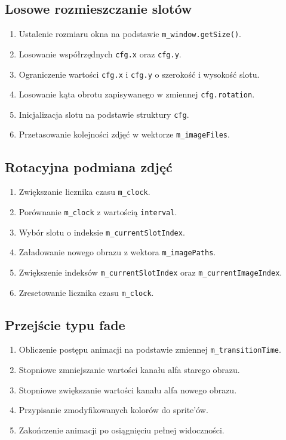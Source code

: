 \documentclass[12pt]{article}
\begin{document}
\subsection{Losowe rozmieszczanie slotów}
\begin{enumerate}
    \item Ustalenie rozmiaru okna na podstawie \texttt{m\_window.getSize()}.
    \item Losowanie współrzędnych \texttt{cfg.x} oraz \texttt{cfg.y}.
    \item Ograniczenie wartości \texttt{cfg.x} i \texttt{cfg.y} o szerokość i wysokość slotu.
    \item Losowanie kąta obrotu zapisywanego w zmiennej \texttt{cfg.rotation}.
    \item Inicjalizacja slotu na podstawie struktury \texttt{cfg}.
    \item Przetasowanie kolejności zdjęć w wektorze \texttt{m\_imageFiles}.
\end{enumerate}

\subsection{Rotacyjna podmiana zdjęć}
\begin{enumerate}
    \item Zwiększanie licznika czasu \texttt{m\_clock}.
    \item Porównanie \texttt{m\_clock} z wartością \texttt{interval}.
    \item Wybór slotu o indeksie \texttt{m\_currentSlotIndex}.
    \item Załadowanie nowego obrazu z wektora \texttt{m\_imagePaths}.
    \item Zwiększenie indeksów \texttt{m\_currentSlotIndex} oraz \texttt{m\_currentImageIndex}.
    \item Zresetowanie licznika czasu \texttt{m\_clock}.
\end{enumerate}

\subsection{Przejście typu fade}
\begin{enumerate}
    \item Obliczenie postępu animacji na podstawie zmiennej \texttt{m\_transitionTime}.
    \item Stopniowe zmniejszanie wartości kanału alfa starego obrazu.
    \item Stopniowe zwiększanie wartości kanału alfa nowego obrazu.
    \item Przypisanie zmodyfikowanych kolorów do sprite'ów.
    \item Zakończenie animacji po osiągnięciu pełnej widoczności.
\end{enumerate}
\end{document}
